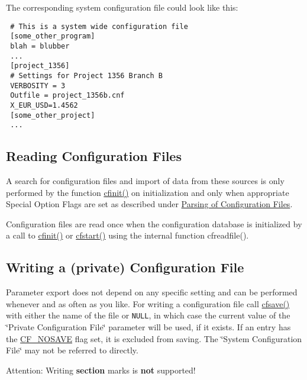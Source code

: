 The corresponding system configuration file could look like this: 

\begin{Code}\begin{verbatim} # This is a system wide configuration file
 [some_other_program]
 blah = blubber
 ...
 [project_1356]
 # Settings for Project 1356 Branch B
 VERBOSITY = 3
 Outfile = project_1356b.cnf
 X_EUR_USD=1.4562
 [some_other_project]
 ...
\end{verbatim}
\end{Code}

\hypertarget{config_files_config_in}{}\subsection{Reading Configuration Files}\label{config_files_config_in}
A search for configuration files and import of data from these sources is only performed by the function \hyperlink{group__cflib__core_ge593ff607f853bd5fc16a16bb6759314}{cfinit()} on initialization and only when appropriate Special Option Flags are set as described under \hyperlink{config_levels_config_file_parsing}{Parsing of Configuration Files}.

Configuration files are read once when the configuration database is initialized by a call to \hyperlink{group__cflib__core_ge593ff607f853bd5fc16a16bb6759314}{cfinit()} or \hyperlink{group__cflib__core_gdcf24d678203bd09a0a3e05b8a986c65}{cfstart()} using the internal function cfreadfile().\hypertarget{config_files_config_out}{}\subsection{Writing a (private) Configuration File}\label{config_files_config_out}
Parameter export does not depend on any specific setting and can be performed whenever and as often as you like. For writing a configuration file call \hyperlink{group__setting__saving_g046d8a68eae35b987eacca04a9a06cca}{cfsave()} with either the name of the file or {\tt NULL}, in which case the current value of the \char`\"{}Private Configuration File\char`\"{} parameter will be used, if it exists. If an entry has the \hyperlink{group__special__options__mask_gd76153c65f68cc0ee5c1a04c8c3e80bf}{CF\_\-NOSAVE} flag set, it is excluded from saving. The \char`\"{}System Configuration File\char`\"{} may not be referred to directly.

\begin{Desc}
\item[Attention:]Writing {\bf section} marks is {\bf not} supported! \end{Desc}
